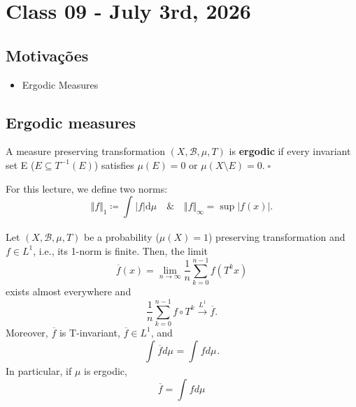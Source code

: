 \documentclass[../fractals_everywhere.tex]{subfiles}
\begin{document}
\section{Class 09 - July 3rd, 2026}
\subsection{Motivações}
\begin{itemize}
	\item Ergodic Measures
\end{itemize}
\subsection{Ergodic measures}
\begin{def*}
	A measure preserving transformation \((X, \mathcal{B}, \mu , T)\) is \textbf{ergodic} if every invariant set E (\(E\subseteq T^{-1}(E)\)) satisfies \(\mu (E) = 0\) or \(\mu (X\setminus{E}) = 0.\; \square\)
\end{def*}
For this lecture, we define two norms:
\[
	\Vert f \Vert_{1}\coloneqq \int_{}^{}| f | \mathrm{d}\mu \quad\&\quad \Vert f \Vert_{\infty} = \sup_{}| f(x) |.
\]
\begin{theorem*}
	Let \((X, \mathcal{B}, \mu , T)\) be a probability (\(\mu (X)=1\)) preserving transformation and \(f\in L^{1}\), i.e., its 1-norm is finite. Then, the limit
	\[
		\overline{f}(x) = \lim_{n\to \infty}\frac{1}{n}\sum\limits_{k=0}^{n-1}f(T^{k}x)
	\]
	exists almost everywhere and
	\[
		\frac{1}{n}\sum\limits_{k=0}^{n-1}f\circ T^{k} \stackrel{L^{1}}\to \overline{f}.
	\]
	Moreover, \(\overline{f}\) is T-invariant, \(\overline{f}\in L^{1}\), and
	\[
		\int_{}\overline{f} d\mu_{} = \int_{}f d\mu_{}.
	\]
	In particular, if \(\mu \) is ergodic,
	\[
		\overline{f} =\int_{}f d\mu_{}
	\]
\end{theorem*}
\end{document}
